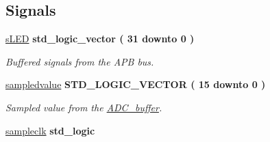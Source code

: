 \subsection*{Signals}
 \begin{DoxyCompactItemize}
\item 
\hypertarget{classdummyapb_1_1APB__interface_ae0194d89ba0e5c1d6f2cd0ca4de6944a}{\hyperlink{classdummyapb_1_1APB__interface_ae0194d89ba0e5c1d6f2cd0ca4de6944a}{s\-L\-E\-D} {\bfseries \textcolor{comment}{std\-\_\-logic\-\_\-vector}\textcolor{vhdlchar}{ }\textcolor{vhdlchar}{(}\textcolor{vhdlchar}{ }\textcolor{vhdlchar}{ } \textcolor{vhdldigit}{31} \textcolor{vhdlchar}{ }\textcolor{vhdlchar}{ }\textcolor{vhdlchar}{ }\textcolor{vhdlkeyword}{downto}\textcolor{vhdlchar}{ }\textcolor{vhdlchar}{ }\textcolor{vhdlchar}{ } \textcolor{vhdldigit}{0} \textcolor{vhdlchar}{ }\textcolor{vhdlchar}{)}\textcolor{vhdlchar}{ }} }\label{classdummyapb_1_1APB__interface_ae0194d89ba0e5c1d6f2cd0ca4de6944a}

\begin{DoxyCompactList}\small\item\em Buffered signals from the A\-P\-B bus. \end{DoxyCompactList}\item 
\hypertarget{classdummyapb_1_1APB__interface_ad5797d4ae2d654477e555700f8c3e43f}{\hyperlink{classdummyapb_1_1APB__interface_ad5797d4ae2d654477e555700f8c3e43f}{sampledvalue} {\bfseries \textcolor{comment}{S\-T\-D\-\_\-\-L\-O\-G\-I\-C\-\_\-\-V\-E\-C\-T\-O\-R}\textcolor{vhdlchar}{ }\textcolor{vhdlchar}{(}\textcolor{vhdlchar}{ }\textcolor{vhdlchar}{ } \textcolor{vhdldigit}{15} \textcolor{vhdlchar}{ }\textcolor{vhdlchar}{ }\textcolor{vhdlchar}{ }\textcolor{vhdlkeyword}{downto}\textcolor{vhdlchar}{ }\textcolor{vhdlchar}{ }\textcolor{vhdlchar}{ } \textcolor{vhdldigit}{0} \textcolor{vhdlchar}{ }\textcolor{vhdlchar}{)}\textcolor{vhdlchar}{ }} }\label{classdummyapb_1_1APB__interface_ad5797d4ae2d654477e555700f8c3e43f}

\begin{DoxyCompactList}\small\item\em Sampled value from the \hyperlink{classADC__buffer}{A\-D\-C\-\_\-buffer}. \end{DoxyCompactList}\item 
\hypertarget{classdummyapb_1_1APB__interface_a3201935a6a12fb549d5d5859e2883faf}{\hyperlink{classdummyapb_1_1APB__interface_a3201935a6a12fb549d5d5859e2883faf}{sampleclk} {\bfseries \textcolor{comment}{std\-\_\-logic}\textcolor{vhdlchar}{ }} }\label{classdummyapb_1_1APB__interface_a3201935a6a12fb549d5d5859e2883faf}


\end{DoxyCompactItemize}
